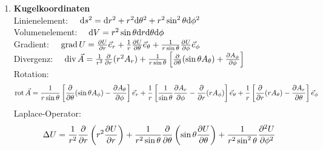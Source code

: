 \documentclass{atistandalonetask}
\begin{document}
\begin{atiTask}[
	title = Formelblatt
]
\begin{enumerate}
  \item \textbf{Kugelkoordinaten}\\[1em]
  Linienelement: $\quad \mathrm{d} s^2 = \mathrm{d} r^2 + r^2 \mathrm{d} \theta^2 + r^2 \sin^2 \theta \mathrm{d}\phi^2$ \\[1em] 
  Volumenelement: $\quad \mathrm{d} V = r^2 \sin\theta  \mathrm{d} r \mathrm{d} \theta \mathrm{d} \phi $ \\[1em]
  Gradient: $\quad \gradient U = \leibnizPartialDerivative{U}{r} \vec{e}_r + \frac{1}{r} \leibnizPartialDerivative{U}{\theta} \vec{e}_\theta + \frac{1}{r\sin\theta} \leibnizPartialDerivative{U}{\phi} \vec{e}_\phi$ \\[1em] 
  Divergenz: $\quad \divergence \vec{A} = \frac{1}{r^2} \leibnizPartialDerivative{}{r} (r^2A_r) + \frac{1}{r\sin\theta} \left[ \leibnizPartialDerivative{}{\theta} (\sin\theta A_\theta) + \leibnizPartialDerivative{A_\phi}{\phi} \right]$ \\[1em]
  Rotation: 
  \begin{align*}
\curl \vec{A} = \frac{1}{r\sin\theta} \left[ \leibnizPartialDerivative{}{\theta} (\sin\theta A_\phi) - \leibnizPartialDerivative{A_\theta}{\phi} \right] \vec{e}_r + \frac{1}{r} \left[ \frac{1}{\sin\theta} \leibnizPartialDerivative{A_r}{\phi} - \leibnizPartialDerivative{}{r}    (r A_\phi) \right] \vec{e}_\theta + \frac{1}{r} \left[ \leibnizPartialDerivative{}{r} (rA_\theta) - \leibnizPartialDerivative{A_r}{\theta} \right] \vec{e}_\phi
  \end{align*} 
  Laplace-Operator:
  \begin{align*}
      \Delta U = \frac{1}{r^2} \leibnizPartialDerivative{}{r} \left( r^2 \leibnizPartialDerivative{U}{r} \right) + \frac{1}{r^2 \sin\theta} \leibnizPartialDerivative{}{\theta} \left( \sin\theta \leibnizPartialDerivative{U}{\theta} \right) + \frac{1}{r^2 \sin^2 \theta} \leibnizPartialDerivative[2]{U}{\phi}
  \end{align*}
\end{enumerate}

\end{atiTask}
\end{document}
